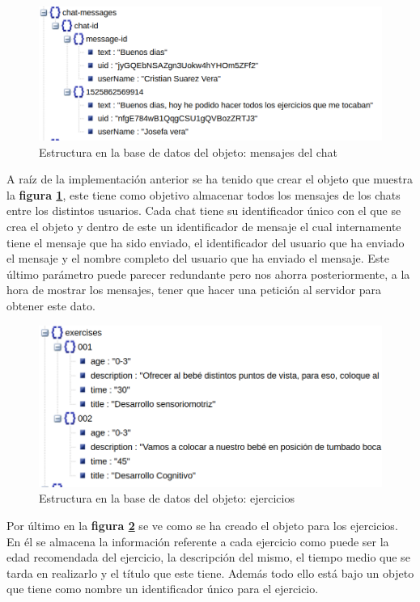 \medskip
\begin{figure}
    \includegraphics[width=\linewidth]{./images/database/chat-messages-database.png}
    \caption{Estructura en la base de datos del objeto: mensajes del chat}
    \label{mensajes-del-chat}
\end{figure}

A raíz de la implementación anterior se ha tenido que crear el objeto
que muestra la \textbf{figura \ref{mensajes-del-chat}}, este tiene como
objetivo almacenar todos los mensajes de los chats entre los distintos
usuarios. Cada chat tiene su identificador único con el que se crea el
objeto y dentro de este un identificador de mensaje el cual internamente
tiene el mensaje que ha sido enviado, el identificador del usuario que
ha enviado el mensaje y el nombre completo del usuario que ha enviado
el mensaje. Este último parámetro puede parecer redundante pero nos
ahorra posteriormente, a la hora de mostrar los mensajes, tener que hacer
una petición al servidor para obtener este dato.

\medskip
\begin{figure}
    \includegraphics[width=\linewidth]{./images/database/exercises-database.png}
    \caption{Estructura en la base de datos del objeto: ejercicios}
    \label{ejercicios}
\end{figure}

Por último en la \textbf{figura \ref{ejercicios}} se ve
como se ha creado el objeto para los ejercicios. En él se almacena la información
referente a cada ejercicio como puede ser la edad recomendada del ejercicio,
la descripción del mismo, el tiempo medio que se tarda en realizarlo y el
título que este tiene. Además todo ello está bajo un objeto que tiene como
nombre un identificador único para el ejercicio.

